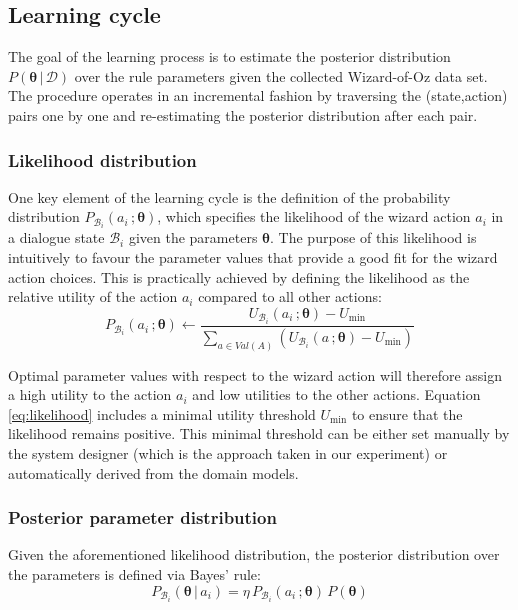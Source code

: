 \subsection{Learning cycle}
\label{sec:rule-supervised-learning}

The goal of the learning process is to estimate the posterior distribution $P(\boldsymbol\theta \, | \, \mathcal{D})$ over the rule parameters given the collected Wizard-of-Oz data set. The procedure operates in an incremental fashion by traversing the (state,action) pairs one by one and re-estimating the posterior distribution after each pair.  

\subsubsection*{Likelihood distribution}

One key element of the learning cycle is the definition of the probability distribution $P_{\mathcal{B}_i}(a_i\,; \boldsymbol\theta)$, which specifies the likelihood of the wizard action $a_i$ in a dialogue state $\mathcal{B}_i$ given the parameters $\boldsymbol\theta$. The purpose of this likelihood is intuitively to favour the parameter values that provide a good fit for the wizard action choices. This is practically achieved by defining the likelihood as the relative utility of the action $a_i$ compared to all other actions: 
\begin{equation}
P_{\mathcal{B}_i}(a_i\,; \boldsymbol\theta) \leftarrow \dfrac{U_{\mathcal{B}_i}(a_i\,; \boldsymbol\theta) - U_{\mathrm{min}}}{\sum_{a \in Val(A)} \left(U_{\mathcal{B}_i}(a\,; \boldsymbol\theta) - U_{\mathrm{min}}\right)} \label{eq:likelihood}
\end{equation}

Optimal parameter values with respect to the wizard action will therefore assign a high utility to the action $a_i$ and low utilities to the other actions. Equation \eqref{eq:likelihood} includes a minimal utility threshold $U_{\mathrm{min}}$ to ensure that the likelihood remains positive. This minimal threshold can be either set manually by the system designer (which is the approach taken in our experiment) or automatically derived from the domain models. 

\subsubsection*{Posterior parameter distribution}

Given the aforementioned likelihood distribution, the posterior distribution over the parameters is defined via Bayes' rule: 
\begin{equation}
P_{\mathcal{B}_i}(\boldsymbol\theta \, | \, a_i) = \eta \, P_{\mathcal{B}_i}(a_i\,; \boldsymbol\theta) \, P(\boldsymbol\theta ) \label{eq:paramposterior}
\end{equation}

